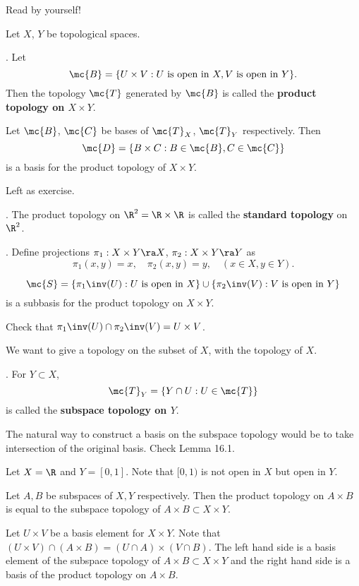 Read by yourself!


Let \(X\), \(Y\) be topological spaces.

. Let
\[
    \mc{B} = \{U \times V: U \text{ is open in } X, V \text{ is open in } Y\}.
\]
Then the topology \(\mc{T}\) generated by \(\mc{B}\) is called the \textbf{product topology on \(X \times Y\)}.

  Let \(\mc{B}\), \(\mc{C}\) be bases of \(\mc{T}_X\), \(\mc{T}_Y\) respectively. Then
\[
    \mc{D} = \{B\times C : B\in \mc{B}, C \in \mc{C}\}
\]
is a basis for the product topology of \(X \times Y\).

\pf Left as exercise.

\ex. The product topology on \(\R^2 = \R \times \R\) is called the \textbf{standard topology} on \(\R^2\).

. Define projections \(\pi_1 : X\times Y \ra X\), \(\pi_2 : X\times Y \ra Y\) as
\[
    \pi_1(x, y) = x, \quad \pi_2(x, y) = y, \quad (x \in X, y\in Y).
\]

\[
    \mc{S} = \{\pi_1\inv(U): U \text{ is open in } X\} \cup \{\pi_2\inv(V) : V \text { is open in } Y\}
\]
is a subbasis for the product topology on \(X\times Y\).

\pf Check that \(\pi_1\inv(U) \cap \pi_2\inv(V) = U \times V\).


We want to give a topology on the subset of \(X\), with the topology of \(X\).

. For \(Y \subset X\),
\[
    \mc{T}_Y = \{Y \cap U : U \in \mc{T}\}
\]
is called the \textbf{subspace topology on \(Y\)}.

The natural way to construct a basis on the subspace topology would be to take intersection of the original basis. Check {\sffamily Lemma 16.1}.

\rmk Let \(X = \R\) and \(Y = [0, 1]\). Note that \([0, 1)\) is not open in \(X\) but open in \(Y\).

 Let \(A, B\) be subspaces of \(X, Y\) respectively. Then the product topology on \(A \times B\) is equal to the subspace topology of \(A \times B \subset X \times Y\).

\pf Let \(U \times V\) be a basis element for \(X \times Y\). Note that \((U\times V) \cap (A \times B) = (U\cap A) \times (V \cap B)\). The left hand side is a basis element of the subspace topology of \(A \times B \subset X \times Y\) and the right hand side is a basis of the product topology on \(A \times B\).

